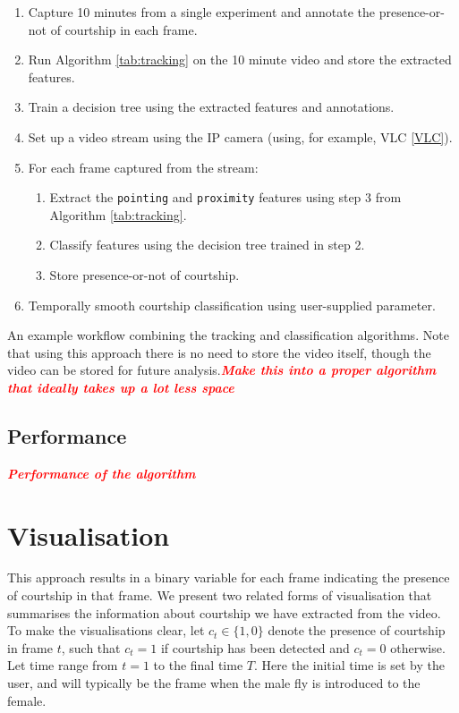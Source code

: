 \documentclass{article}
\newcommand{\todo}[1]{\textsf{\emph{\textbf{\textcolor{red}{#1}}}}}
\newcommand{\var}[1]{\texttt{#1}}
\begin{document}
\begin{table}
\begin{enumerate}
	\item Capture 10 minutes from a single experiment and annotate the presence-or-not of courtship in each frame.
	\item Run Algorithm \ref{tab:tracking} on the 10 minute video and store the extracted features.
	\item Train a decision tree using the extracted features and annotations.
	\item Set up a video stream using the IP camera (using, for example, VLC \ref{VLC}). 
	\item For each frame captured from the stream:
	\begin{enumerate}
		\item Extract the \var{pointing} and \var{proximity} features using step 3 from Algorithm \ref{tab:tracking}.
		\item Classify features using the decision tree trained in step 2.
		\item Store presence-or-not of courtship.
	\end{enumerate}
	\item Temporally smooth courtship classification using user-supplied parameter.
\end{enumerate}
		
\label{tab:tracking}
\caption{An example workflow combining the tracking and classification algorithms. Note that using this approach there is no need to store the video itself, though the video can be stored for future analysis.\todo{Make this into a proper algorithm that ideally takes up a lot less space}}
\end{table}

\subsection{Performance}

\todo{Performance of the algorithm}

\section{Visualisation}
\label{sec:visualisation}

This approach results in a binary variable for each frame indicating the presence of courtship in that frame. We present two related forms of visualisation that summarises the information about courtship we have extracted from the video. To make the visualisations clear, let $c_t \in \{1,0\}$ denote the presence of courtship in frame $t$, such that $c_t = 1$ if courtship has been detected and $c_t = 0$ otherwise. Let time range from $t=1$ to the final time $T$. Here the initial time is set by the user, and will typically be the frame when the male fly is introduced to the female.
\end{document}

